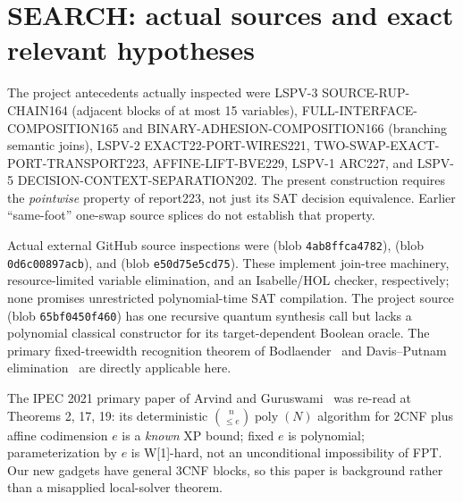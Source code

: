 \documentclass[11pt]{article}
\begin{document}
\section{SEARCH: actual sources and exact relevant hypotheses}
The project antecedents actually inspected were LSPV-3 SOURCE-RUP-CHAIN164 (adjacent blocks of at most 15 variables), FULL-INTERFACE-COMPOSITION165 and BINARY-ADHESION-COMPOSITION166 (branching semantic joins), LSPV-2 EXACT22-PORT-WIRES221, TWO-SWAP-EXACT-PORT-TRANSPORT223, AFFINE-LIFT-BVE229, LSPV-1 ARC227, and LSPV-5 DECISION-CONTEXT-SEPARATION202. The present construction requires the \emph{pointwise} property of report223, not just its SAT decision equivalence. Earlier ``same-foot'' one-swap source splices do not establish that property.

Actual external GitHub source inspections were  (blob \texttt{4ab8ffca4782}),  (blob \texttt{0d6c00897acb}), and  (blob \texttt{e50d75e5cd75}). These implement join-tree machinery, resource-limited variable elimination, and an Isabelle/HOL checker, respectively; none promises unrestricted polynomial-time SAT compilation. The project source  (blob \texttt{65bf0450f460}) has one recursive quantum synthesis call but lacks a polynomial classical constructor for its target-dependent Boolean oracle. The primary fixed-treewidth recognition theorem of Bodlaender~\cite{bodlaender} and Davis--Putnam elimination~\cite{dp} are directly applicable here.

The IPEC 2021 primary paper of Arvind and Guruswami~\cite{arvind} was re-read at Theorems 2, 17, 19: its deterministic $\binom{n}{\le e}\operatorname{poly}(N)$ algorithm for 2CNF plus affine codimension $e$ is a \emph{known} XP bound; fixed $e$ is polynomial; parameterization by $e$ is W[1]-hard, not an unconditional impossibility of FPT. Our new gadgets have general 3CNF blocks, so this paper is background rather than a misapplied local-solver theorem.
\end{document}
